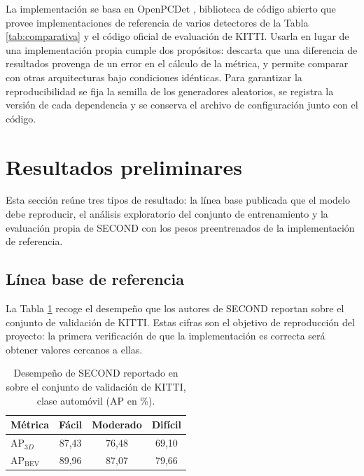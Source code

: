 \documentclass[11pt,letterpaper]{article}
\begin{document}
La implementación se basa en OpenPCDet \cite{openpcdet}, biblioteca de código abierto que provee implementaciones de referencia de varios detectores de la Tabla \ref{tab:comparativa} y el código oficial de evaluación de KITTI. Usarla en lugar de una implementación propia cumple dos propósitos: descarta que una diferencia de resultados provenga de un error en el cálculo de la métrica, y permite comparar con otras arquitecturas bajo condiciones idénticas. Para garantizar la reproducibilidad se fija la semilla de los generadores aleatorios, se registra la versión de cada dependencia y se conserva el archivo de configuración junto con el código.

\section{Resultados preliminares}

Esta sección reúne tres tipos de resultado: la línea base publicada que el modelo debe reproducir, el análisis exploratorio del conjunto de entrenamiento y la evaluación propia de SECOND con los pesos preentrenados de la implementación de referencia.

\subsection{Línea base de referencia}

La Tabla \ref{tab:baseline} recoge el desempeño que los autores de SECOND reportan sobre el conjunto de validación de KITTI. Estas cifras son el objetivo de reproducción del proyecto: la primera verificación de que la implementación es correcta será obtener valores cercanos a ellas.

\begin{table}[htbp]
\caption{Desempeño de SECOND reportado en \cite{yan2018} sobre el conjunto de validación de KITTI, clase automóvil (AP en \%).}
\label{tab:baseline}
\centering
\small
\begin{tabular}{@{}lccc@{}}
\toprule
\textbf{Métrica} & \textbf{Fácil} & \textbf{Moderado} & \textbf{Difícil} \\
\midrule
AP$_{3D}$ & 87,43 & 76,48 & 69,10 \\
AP$_{\text{BEV}}$ & 89,96 & 87,07 & 79,66 \\
\bottomrule
\end{tabular}
\end{table}
\end{document}
